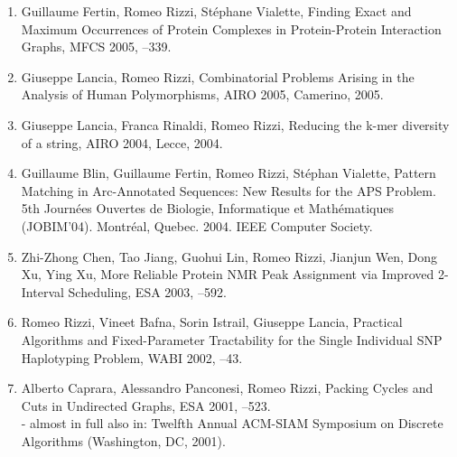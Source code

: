 \documentclass[10pt]{article}
\begin{document}
\begin{enumerate}
  \item {\sc Guillaume Fertin, Romeo Rizzi, St\'ephane Vialette},
   \newblock  Finding Exact and Maximum Occurrences of Protein Complexes in Protein-Protein Interaction Graphs,
   \newblock MFCS 2005,
   --339.

\vspace{-1.8mm}
  \item {\sc Giuseppe Lancia, Romeo Rizzi},
   \newblock Combinatorial Problems Arising in the Analysis of Human Polymorphisms,
   \newblock AIRO 2005, Camerino, 2005.

\vspace{-1.8mm}
  \item {\sc Giuseppe Lancia, Franca Rinaldi, Romeo Rizzi},
   \newblock Reducing the k-mer diversity of a string,
   \newblock AIRO 2004, Lecce, 2004.

\vspace{-1.8mm}
  \item {\sc Guillaume Blin, Guillaume Fertin, Romeo Rizzi, St\'ephan Vialette},
   \newblock Pattern Matching in Arc-Annotated Sequences: New Results for the APS Problem.
   \newblock 5th Journ\'ees Ouvertes de Biologie, Informatique et Math\'ematiques (JOBIM'04).
   \newblock Montr\'eal, Quebec. 2004.
   \newblock IEEE Computer Society.

  \item {\sc Zhi-Zhong Chen, Tao Jiang, Guohui Lin, Romeo Rizzi, Jianjun Wen, Dong Xu, Ying Xu},
   \newblock  More Reliable Protein NMR Peak Assignment via Improved 2-Interval Scheduling,
   \newblock ESA 2003,
   --592.

  \item {\sc Romeo Rizzi, Vineet Bafna, Sorin Istrail, Giuseppe Lancia},
   \newblock  Practical Algorithms and Fixed-Parameter Tractability for the Single Individual SNP Haplotyping Problem,
   \newblock WABI 2002,
   --43.

  \item {\sc Alberto Caprara, Alessandro Panconesi, Romeo Rizzi},
   \newblock  Packing Cycles and Cuts in Undirected Graphs,
   \newblock ESA 2001,
   --523.
   \newblock \\ - almost in full also in: Twelfth Annual ACM-SIAM Symposium on Discrete Algorithms (Washington, DC, 2001).



\end{enumerate}
\end{document}
